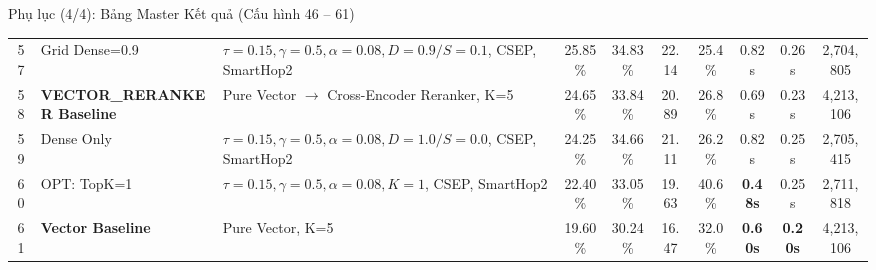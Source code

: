 \documentclass[aspectratio=169,10pt]{beamer}
\begin{document}
\begin{frame}{Phụ lục (4/4): Bảng Master Kết quả (Cấu hình 46 -- 61)}
{\begin{tabular}{c l l ccccccc}
57 & Grid Dense=0.9 & $\tau=0.15, \gamma=0.5, \alpha=0.08, D=0.9/S=0.1$, CSEP, SmartHop2 & 25.85\% & 34.83\% & 22.14 & 25.4\% & 0.82s & 0.26s & 2,704,805 \\
58 & \textbf{VECTOR\_RERANKER Baseline} & Pure Vector $\rightarrow$ Cross-Encoder Reranker, K=5 & 24.65\% & 33.84\% & 20.89 & 26.8\% & 0.69s & 0.23s & 4,213,106 \\
59 & Dense Only & $\tau=0.15, \gamma=0.5, \alpha=0.08, D=1.0/S=0.0$, CSEP, SmartHop2 & 24.25\% & 34.66\% & 21.11 & 26.2\% & 0.82s & 0.25s & 2,705,415 \\
60 & OPT: TopK=1 & $\tau=0.15, \gamma=0.5, \alpha=0.08, K=1$, CSEP, SmartHop2 & 22.40\% & 33.05\% & 19.63 & 40.6\% & \textbf{0.48s} & 0.25s & 2,711,818 \\
61 & \textbf{Vector Baseline} & Pure Vector, K=5 & 19.60\% & 30.24\% & 16.47 & 32.0\% & \textbf{0.60s} & \textbf{0.20s} & 4,213,106 \\
\bottomrule
\end{tabular}
}
\end{frame}
\end{document}
